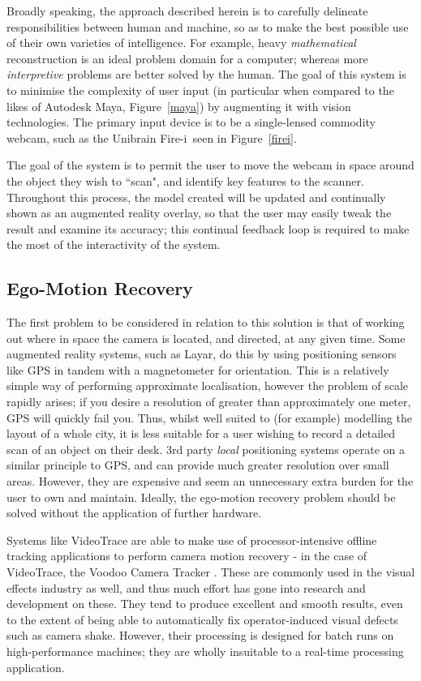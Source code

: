 \documentclass[a4paper,10pt]{article}
\begin{document}
Broadly speaking, the approach described herein is to carefully delineate responsibilities between human and machine, so as to make the best possible use of their own varieties of intelligence. For example, heavy \textit{mathematical} reconstruction is an ideal problem domain for a computer; whereas more \textit{interpretive} problems are better solved by the human. The goal of this system is to minimise the complexity of user input (in particular when compared to the likes of Autodesk Maya, Figure~\ref{maya}) by augmenting it with vision technologies. The primary input device is to be a single-lensed commodity webcam, such as the Unibrain Fire-i\texttrademark ~seen in Figure~\ref{firei}.

The goal of the system is to permit the user to move the webcam in space around the object they wish to ``scan", and identify key features to the scanner. Throughout this process, the model created will be updated and continually shown as an augmented reality overlay, so that the user may easily tweak the result and examine its accuracy; this continual feedback loop is required to make the most of the interactivity of the system.

\subsection{Ego-Motion Recovery}
The first problem to be considered in relation to this solution is that of working out where in space the camera is located, and directed, at any given time. Some augmented reality systems, such as Layar, do this by using positioning sensors like GPS in tandem with a magnetometer for orientation. This is a relatively simple way of performing approximate localisation, however the problem of scale rapidly arises; if you desire a resolution of greater than approximately one meter, GPS will quickly fail you. Thus, whilst well suited to (for example) modelling the layout of a whole city, it is less suitable for a user wishing to record a detailed scan of an object on their desk. 3rd party \textit{local} positioning systems operate on a similar principle to GPS, and can provide much greater resolution over small areas. However, they are expensive and seem an unnecessary extra burden for the user to own and maintain. Ideally, the ego-motion recovery problem should be solved without the application of further hardware.

Systems like VideoTrace \cite{videotrace} are able to make use of processor-intensive offline tracking applications  to perform camera motion recovery - in the case of VideoTrace, the Voodoo Camera Tracker \cite{voodoo}. These are commonly used in the visual effects industry as well, and thus much effort has gone into research and development on these. They tend to produce excellent and smooth results, even to the extent of being able to automatically fix operator-induced visual defects such as camera shake. However, their processing is designed for batch runs on high-performance machines; they are wholly insuitable to a real-time processing application.
\end{document}
